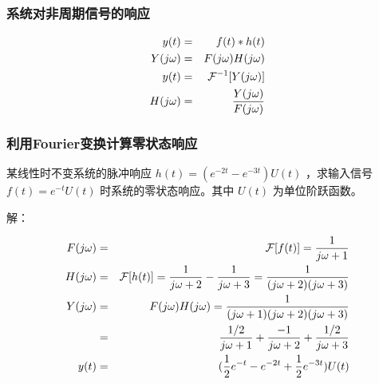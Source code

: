 \documentclass{beamer}
\begin{document}
\begin{frame}
\frametitle{系统对非周期信号的响应}
\label{sec-7-4}

\begin{eqnarray*}
y(t) & =& f(t)*h(t)\\
Y(j\omega) &=& F(j\omega)H(j\omega)\\
y(t) &=& {\cal F}^{-1}[Y(j\omega)] \\
H(j\omega) &=& \frac{Y(j\omega)}{F(j\omega)}
\end{eqnarray*}
\end{frame}
\begin{frame}
\frametitle{利用Fourier变换计算零状态响应}
\label{sec-7-5}

某线性时不变系统的脉冲响应 $h(t)=(e^{-2t}-e^{-3t})U(t)$ ，求输入信号 $f(t)=e^{-t}U(t)$ 时系统的零状态响应。其中 $U(t)$ 为单位阶跃函数。

解：

\begin{eqnarray*}
F(j\omega) & =& {\cal F}[f(t)] = \frac{1}{j\omega+1} \\ H(j\omega) &=& {\cal F}[h(t)] = \frac{1}{j\omega+2}-\frac{1}{j\omega+3}=\frac{1}{(j\omega+2)(j\omega+3)}\\
Y(j\omega) &=& F(j\omega)H(j\omega) = \frac{1}{(j\omega+1)(j\omega+2)(j\omega+3)}\\
           &=& \frac{1/2}{j\omega+1}+\frac{-1}{j\omega+2}+\frac{1/2}{j\omega+3}\\
y(t) &=& (\frac{1}{2}e^{-t}-e^{-2t}+\frac{1}{2}e^{-3t})U(t)
\end{eqnarray*}
\end{frame}
\end{document}
